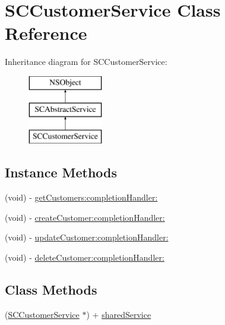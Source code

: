 \hypertarget{interface_s_c_customer_service}{}\section{S\+C\+Customer\+Service Class Reference}
\label{interface_s_c_customer_service}
Inheritance diagram for S\+C\+Customer\+Service\+:\begin{figure}[H]
\begin{center}
\leavevmode
\includegraphics[height=3.000000cm]{interface_s_c_customer_service}
\end{center}
\end{figure}
\subsection*{Instance Methods}
\begin{DoxyCompactItemize}
\item 
(void) -\/ \hyperlink{interface_s_c_customer_service_a2d9a6679bfb4fe0044e773c6f310d5f8}{get\+Customers\+:completion\+Handler\+:}
\item 
(void) -\/ \hyperlink{interface_s_c_customer_service_a7bb9a10b4815215b56c39680f453d324}{create\+Customer\+:completion\+Handler\+:}
\item 
(void) -\/ \hyperlink{interface_s_c_customer_service_ad91a51099e96c353ab7cd62fb03deffe}{update\+Customer\+:completion\+Handler\+:}
\item 
(void) -\/ \hyperlink{interface_s_c_customer_service_a45ad4b819c4ecea0cb7042ba74a5f9e5}{delete\+Customer\+:completion\+Handler\+:}
\end{DoxyCompactItemize}
\subsection*{Class Methods}
\begin{DoxyCompactItemize}
\item 
(\hyperlink{interface_s_c_customer_service}{S\+C\+Customer\+Service} $\ast$) + \hyperlink{interface_s_c_customer_service_ac7cedd69d8d436982ba853129fbeead7}{shared\+Service}
\end{DoxyCompactItemize}
